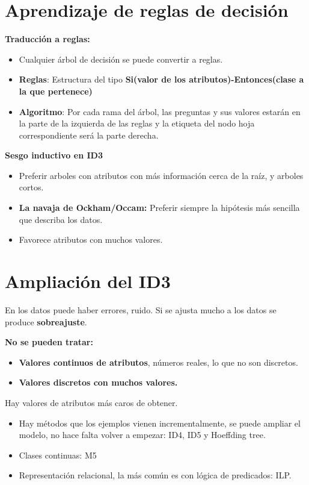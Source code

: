 \documentclass[12pt]{report} %
\begin{document}
\section{Aprendizaje de reglas de
decisión}

\textbf{Traducción a reglas:}

\begin{itemize}
\item
  Cualquier árbol de decisión se puede convertir a reglas.
\item
  \textbf{Reglas}: Estructura del tipo \textbf{Si(valor de los
  atributos)-Entonces(clase a la que pertenece)}
\item
  \textbf{Algoritmo}: Por cada rama del árbol, las preguntas y sus
  valores estarán en la parte de la izquierda de las reglas y la
  etiqueta del nodo hoja correspondiente será la parte derecha.
\end{itemize}

\textbf{Sesgo inductivo en ID3}

\begin{itemize}
\item
  Preferir arboles con atributos con más información cerca de la raíz, y
  arboles cortos.
\item
  \textbf{La navaja de Ockham/Occam:} Preferir siempre la hipótesis más
  sencilla que describa los datos.
\item
  Favorece atributos con muchos valores.
\end{itemize}

\section{Ampliación del ID3}

En los datos puede haber errores, ruido. Si se ajusta mucho a los datos
se produce \textbf{sobreajuste}.

\textbf{No se pueden tratar:}

\begin{itemize}

\item
  \textbf{Valores continuos de atributos}, números reales, lo que no son
  discretos.
\item
  \textbf{Valores discretos con muchos valores.}
\end{itemize}

Hay valores de atributos más caros de obtener.

\begin{itemize}
\item
  Hay métodos que los ejemplos vienen incrementalmente, se puede ampliar
  el modelo, no hace falta volver a empezar: ID4, ID5 y Hoeffding tree.
\item
  Clases continuas: M5
\item
  Representación relacional, la más común es con lógica de predicados:
  ILP.
\end{itemize}
\end{document}
